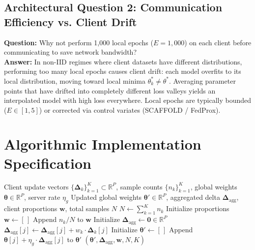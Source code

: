 \documentclass[11pt,a4paper]{article}
\theoremstyle{definition}
\begin{document}
\subsection{Architectural Question 2: Communication Efficiency vs. Client Drift}
\textbf{Question:} Why not perform 1,000 local epochs ($E=1,000$) on each client before communicating to save network bandwidth?\\
\textbf{Answer:} In non-IID regimes where client datasets have different distributions, performing too many local epochs causes client drift: each model overfits to its local distribution, moving toward local minima $\theta_k^* \neq \theta^*$. Averaging parameter points that have drifted into completely different loss valleys yields an interpolated model with high loss everywhere. Local epochs are typically bounded ($E \in [1, 5]$) or corrected via control variates (SCAFFOLD / FedProx).

\section{Algorithmic Implementation Specification}

\begin{algorithm}[H]
\caption{Federated Averaging (FedAvg) Server Aggregation}
\begin{algorithmic}[1]
\Require Client update vectors $\{\boldsymbol{\Delta}_k\}_{k=1}^K \subset \mathbb{R}^P$, sample counts $\{n_k\}_{k=1}^K$, global weights $\boldsymbol{\theta} \in \mathbb{R}^P$, server rate $\eta_g$
\Ensure Updated global weights $\boldsymbol{\theta}' \in \mathbb{R}^P$, aggregated delta $\boldsymbol{\Delta}_{\text{agg}}$, client proportions $\mathbf{w}$, total samples $N$
\State $N \gets \sum_{k=1}^K n_k$
\State Initialize proportions $\mathbf{w} \gets [\,]$
    \State Append $n_k / N$ to $\mathbf{w}$
\EndFor
\State Initialize $\boldsymbol{\Delta}_{\text{agg}} \gets \mathbf{0} \in \mathbb{R}^P$
        \State $\boldsymbol{\Delta}_{\text{agg}}[j] \gets \boldsymbol{\Delta}_{\text{agg}}[j] + w_k \cdot \boldsymbol{\Delta}_k[j]$
    \EndFor
\EndFor
\State Initialize $\boldsymbol{\theta}' \gets [\,]$
    \State Append $\boldsymbol{\theta}[j] + \eta_g \cdot \boldsymbol{\Delta}_{\text{agg}}[j]$ to $\boldsymbol{\theta}'$
\EndFor
\State \Return $(\boldsymbol{\theta}', \boldsymbol{\Delta}_{\text{agg}}, \mathbf{w}, N, K)$
\end{algorithmic}
\end{algorithm}
\end{document}
